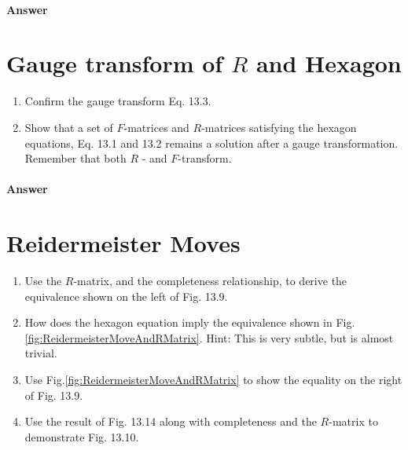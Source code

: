 \paragraph{Answer}

\section{Gauge transform of $R$ and Hexagon}

\begin{enumerate}
\item Confirm the gauge transform Eq. 13.3.
\item Show that a set of $F$-matrices and $R$-matrices satisfying the hexagon equations, Eq. 13.1 and 13.2 remains a solution after a gauge transformation. Remember that both $R$ - and $F$-transform.
\end{enumerate}

\paragraph{Answer}

\section{Reidermeister Moves}

\begin{enumerate}
\item Use the $R$-matrix, and the completeness relationship, to derive the equivalence shown on the left of Fig. 13.9.
\item How does the hexagon equation imply the equivalence shown in Fig.\ref{fig:ReidermeisterMoveAndRMatrix}. Hint: This is very subtle, but is almost trivial.
\item Use Fig.\ref{fig:ReidermeisterMoveAndRMatrix} to show the equality on the right of Fig. 13.9.
\item Use the result of Fig. 13.14 along with completeness and the $R$-matrix to demonstrate Fig. 13.10.
\end{enumerate}

